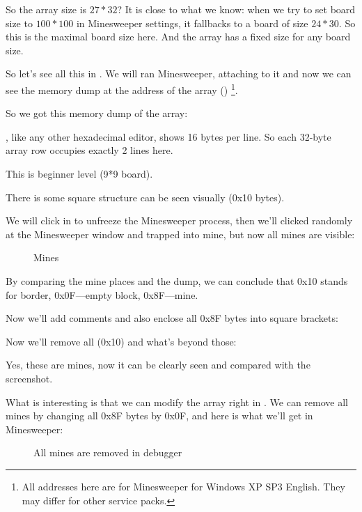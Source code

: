 So the array size is $27*32$?
It is close to what we know: when we try to set board size to $100*100$ in Minesweeper settings, it fallbacks to a board of size $24*30$.
So this is the maximal board size here.
And the array has a fixed size for any board size.

So let's see all this in \olly.
We will ran Minesweeper, attaching \olly to it and now we can see the memory dump at the address of the  array ()
\footnote{All addresses here are for Minesweeper for Windows XP SP3 English. 
They may differ for other service packs.}.

So we got this memory dump of the array:



\olly, like any other hexadecimal editor, shows 16 bytes per line.
So each 32-byte array row occupies exactly 2 lines here.

This is beginner level (9*9 board).

There is some square 
structure can be seen visually (0x10 bytes).

We will click  in \olly to unfreeze the Minesweeper process, then we'll clicked randomly at the Minesweeper window 
and trapped into mine, but now all mines are visible:

\begin{figure}[H]
\centering
{}
\caption{Mines}
\label{fig:minesweeper1}
\end{figure}

By comparing the mine places and the dump, we can conclude that 0x10 stands for border, 0x0F---empty block, 0x8F---mine.

Now we'll add comments and also enclose all 0x8F bytes into square brackets:



Now we'll remove all  (0x10) and what's beyond those:



Yes, these are mines, now it can be clearly seen and compared with the screenshot.

\clearpage
What is interesting is that we can modify the array right in \olly.
We can remove all mines by changing all 0x8F bytes by 0x0F, and here is what we'll get in Minesweeper:

\begin{figure}[H]
\centering
{}
\caption{All mines are removed in debugger}
\label{fig:minesweeper3}
\end{figure}

